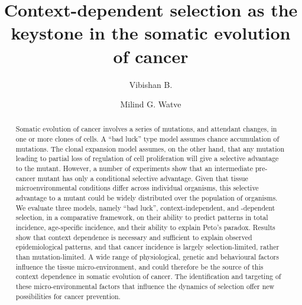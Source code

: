 \documentclass[12pt,onecolumn,twoside]{article}
\date{\empty}
\author[1]{Vibishan B.}
\author[1,*]{Milind G. Watve}
\affil[1]{Department of Biology, Indian Institute of Science Education and Research (IISER), Pune}
\affil[*]{Corresponding author: milind@iiserpune.ac.in}
\title{Context-dependent selection as the keystone in the somatic evolution of cancer}
\begin{document}
\maketitle
\begin{abstract}
	Somatic evolution of cancer involves a series of mutations, and attendant changes, in one or more clones of cells. A ``bad luck'' type model assumes chance accumulation of mutations. The clonal expansion model assumes, on the other hand, that any mutation leading to partial loss of regulation of cell proliferation will give a selective advantage to the mutant. However, a number of experiments show that an intermediate pre-cancer mutant has only a conditional selective advantage. Given that tissue microenvironmental conditions differ across individual organisms, this selective advantage to a mutant could be widely distributed over the population of organisms. We evaluate three models, namely ``bad luck'', context-independent, and -dependent selection, in a comparative framework, on their ability to predict patterns in total incidence, age-specific incidence, and their ability to explain Peto’s paradox. Results show that context dependence is necessary and sufficient to explain observed epidemiological patterns, and that cancer incidence is largely selection-limited, rather than mutation-limited. A wide range of physiological, genetic and behavioural factors influence the tissue micro-environment, and could therefore be the source of this context dependence in somatic evolution of cancer. The identification and targeting of these micro-environmental factors that influence the dynamics of selection offer new possibilities for cancer prevention.
\end{abstract}
\end{document}
